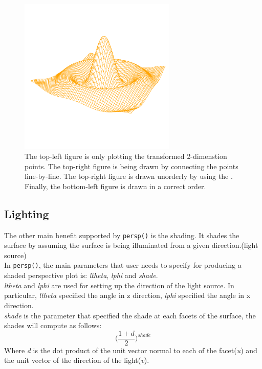 \documentclass[paper=a4, fontsize=11pt]{report}
\begin{document}
\begin{figure}[h]
\begin{center}
  \includegraphics[height = 7.5cm, width = 7.5cm]{figure/standalone_p_4.pdf}
  \caption{The top-left figure is only plotting the transformed 2-dimenstion points. The top-right figure is being drawn by connecting the points line-by-line. The top-right figure is drawn unorderly by using the . Finally, the bottom-left figure is drawn in a correct order.}
  	\label{figure4}
\end{center}
\end{figure}

\subsection{Lighting}
The other main benefit supported by \texttt{persp()} is the shading. It shades the surface by assuming the surface is being illuminated from a given direction.(light source)\\

In \texttt{persp()}, the main parameters that user needs to specify for producing a shaded perspective plot is: \textit{ltheta}, \textit{lphi} and \textit{shade}.\\

\textit{ltheta} and \textit{lphi} are used for setting up the direction of the light source. In particular, \textit{ltheta} specified the angle in z direction, \textit{lphi} specified the angle in x direction. \\

\textit{shade} is the parameter that specified the shade at each facets of the surface, the shades will compute as follows:
\begin{equation}
\big(\frac{1 + d}{2}\big)^{shade}
\end{equation}
Where \textit{d} is the dot product of the unit vector normal to each of the facet(\textit{u}) and the unit vector of the direction of the light(\textit{v}). \\
\end{document}
